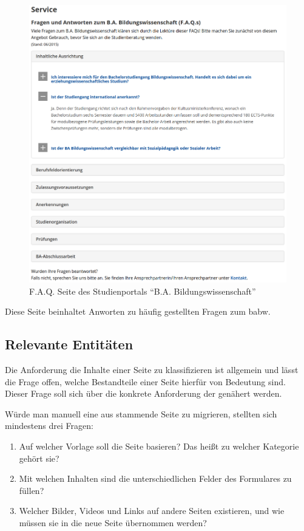     \begin{figure}
        \centering
        \includegraphics[width=\textwidth]{../resources/babw_service_faq.png}
        \caption{F.A.Q. Seite des Studienportals "`B.A. Bildungswissenschaft"'}
        \label{image:BaBwFAQ}
    \end{figure}

    Diese Seite beinhaltet Anworten zu häufig gestellten Fragen
    zum \gls{babw}.

    \subsection{Relevante Entitäten}
        Die Anforderung die Inhalte einer Seite zu klassifizieren
        ist allgemein und lässt die Frage offen,
        welche Bestandteile einer Seite hierfür von Bedeutung sind.
        Dieser Frage soll sich über die konkrete Anforderung
        der {\fernUni} genähert werden.

        Würde man manuell eine aus {\wordpress} stammende Seite zu
        {\imperia} migrieren, stellten sich mindestens drei Fragen:

        \begin{enumerate}
            \item   Auf welcher Vorlage soll die Seite basieren?
                    Das heißt zu welcher Kategorie gehört sie?
            \item   Mit welchen Inhalten sind die unterschiedlichen Felder
                    des Formulares zu füllen?
            \item   Welcher Bilder, Videos und Links auf andere Seiten existieren,
                    und wie müssen sie in die neue Seite übernommen werden?
        \end{enumerate}

